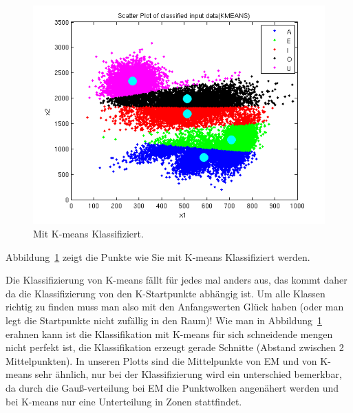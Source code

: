 \begin{figure}[h!]
  \begin{center}
    \includegraphics[width=1\textwidth]{./figures/6_2_classified}
    \caption{Mit K-means Klassifiziert.}
    \label{fig:6_2_classified}
  \end{center}
\end{figure}

Abbildung~\ref{fig:6_2_classified} zeigt die Punkte wie Sie mit K-means Klassifiziert werden.\newline
 


Die Klassifizierung von K-means fällt für jedes mal anders aus, das kommt daher da die Klassifizierung von den K-Startpunkte abhängig ist. Um alle Klassen richtig zu finden muss man also mit den Anfangswerten Glück haben (oder man legt die Startpunkte nicht zufällig in den Raum)! Wie man in Abbildung~\ref{fig:6_2_classified} erahnen kann ist die Klassifikation mit K-means für sich schneidende mengen nicht perfekt ist, die Klassifikation erzeugt gerade Schnitte (Abstand zwischen 2 Mittelpunkten).
In unseren Plotts sind die Mittelpunkte von  EM und von K-means sehr ähnlich, nur bei der Klassifizierung wird ein unterschied bemerkbar, da durch die Gauß-verteilung bei EM die Punktwolken angenähert werden und bei K-means nur eine Unterteilung in Zonen stattfindet.
